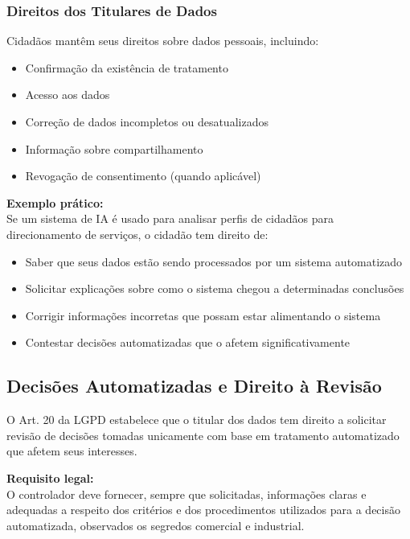 \documentclass[12pt,a4paper]{article}
\begin{document}
\subsubsection{Direitos dos Titulares de Dados}
Cidadãos mantêm seus direitos sobre dados pessoais, incluindo:
\begin{itemize}
    \item Confirmação da existência de tratamento
    \item Acesso aos dados
    \item Correção de dados incompletos ou desatualizados
    \item Informação sobre compartilhamento
    \item Revogação de consentimento (quando aplicável)
\end{itemize}

\begin{tcolorbox}[example]
\textbf{Exemplo prático:} \\
Se um sistema de IA é usado para analisar perfis de cidadãos para direcionamento de serviços, o cidadão tem direito de:
\begin{itemize}
    \item Saber que seus dados estão sendo processados por um sistema automatizado
    \item Solicitar explicações sobre como o sistema chegou a determinadas conclusões
    \item Corrigir informações incorretas que possam estar alimentando o sistema
    \item Contestar decisões automatizadas que o afetem significativamente
\end{itemize}
\end{tcolorbox}

\subsection{Decisões Automatizadas e Direito à Revisão}

O Art. 20 da LGPD estabelece que o titular dos dados tem direito a solicitar revisão de decisões tomadas unicamente com base em tratamento automatizado que afetem seus interesses.

\begin{tcolorbox}[highlight]
\textbf{Requisito legal:} \\
O controlador deve fornecer, sempre que solicitadas, informações claras e adequadas a respeito dos critérios e dos procedimentos utilizados para a decisão automatizada, observados os segredos comercial e industrial.
\end{tcolorbox}
\end{document}
